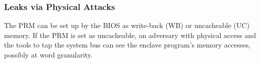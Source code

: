 \subsubsection{Leaks via Physical Attacks}

The PRM can be set up by the BIOS as write-back (WB) or uncacheable (UC)
memory. If the PRM is set as uncacheable, an adversary with physical
access and the tools to tap the system bus can see the enclave program's
memory accesses, possibly at word granularity.

